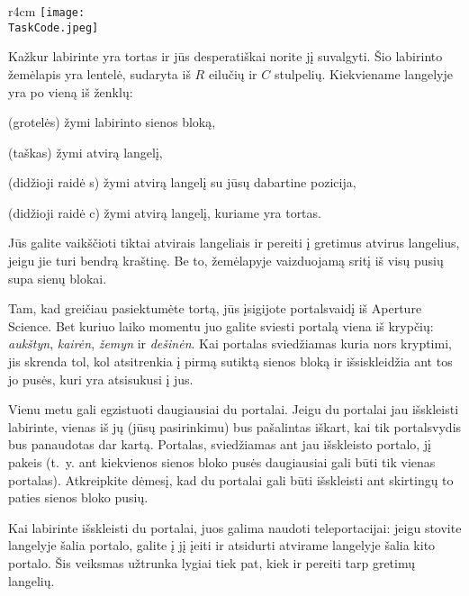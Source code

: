 \documentclass{boi2014-lt}
\renewcommand{\TaskCode}{portals}
\newcommand{\constant}[1]{{\tt #1}}
\begin{document}
    \begin{wrapfigure}[3]{r}{4cm}
        \vspace{-24pt}
		\texttt{[image: \\TaskCode.jpeg]}
	\end{wrapfigure}

    Kažkur labirinte yra tortas ir jūs desperatiškai norite jį suvalgyti.
    Šio labirinto žemėlapis yra lentelė, sudaryta iš $R$ eilučių ir $C$ stulpelių.
    Kiekviename langelyje yra po vieną iš ženklų:
    \begin{description}[itemindent=1pt]
    	\item[\constant{\#}] (grotelės) žymi labirinto sienos bloką,
        \item[\constant{.}] (taškas) žymi atvirą langelį,
        \item[\constant{S}] (didžioji raidė s) žymi atvirą langelį su jūsų
            dabartine pozicija,
        \item[\constant{C}] (didžioji raidė c) žymi atvirą langelį, kuriame yra
            tortas.
    \end{description}

    Jūs galite vaikščioti tiktai atvirais langeliais ir pereiti į gretimus
	atvirus langelius, jeigu jie turi bendrą kraštinę. Be to, žemėlapyje
	vaizduojamą sritį iš visų pusių supa sienų blokai.

    Tam, kad greičiau pasiektumėte tortą, jūs įsigijote portalsvaidį iš
    Aperture Science\texttrademark{}. Bet kuriuo laiko momentu juo galite sviesti
    portalą viena iš krypčių: \emph{aukštyn}, \emph{kairėn}, \emph{žemyn} ir
    \emph{dešinėn}. Kai portalas sviedžiamas kuria nors kryptimi, jis skrenda
    tol, kol atsitrenkia į pirmą sutiktą sienos bloką ir išsiskleidžia ant tos jo
    pusės, kuri yra atsisukusi į jus.

    Vienu metu gali egzistuoti daugiausiai du portalai. Jeigu du portalai jau
    išskleisti labirinte, vienas iš jų (jūsų pasirinkimu) bus pašalintas iškart,
    kai tik portalsvydis bus panaudotas dar kartą. Portalas, sviedžiamas ant
	jau išskleisto portalo, jį pakeis (t.~y. ant kiekvienos sienos bloko pusės
	daugiausiai gali būti tik vienas portalas).
	Atkreipkite dėmesį, kad du portalai gali būti išskleisti ant skirtingų to
	paties sienos bloko pusių.

    Kai labirinte išskleisti du portalai, juos galima naudoti teleportacijai:
    jeigu stovite langelyje šalia portalo, galite į jį įeiti ir atsidurti atvirame langelyje šalia
    kito portalo. Šis veiksmas užtrunka lygiai tiek pat, kiek ir pereiti tarp
    gretimų langelių.
\end{document}
